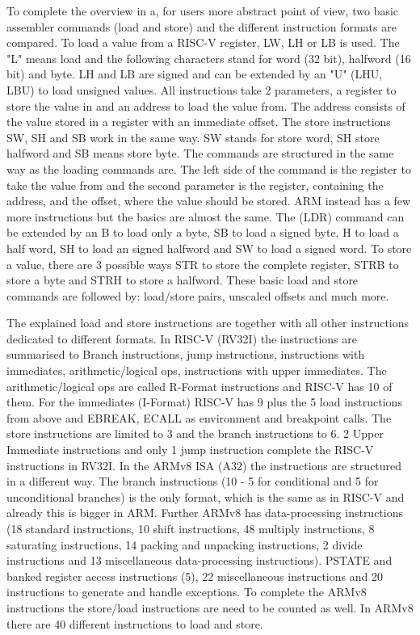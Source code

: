 \documentclass[conference]{IEEEtran}
\begin{document}
	To complete the overview in a, for users more abstract point of view, two basic assembler commands (load and store) and the different instruction formats are compared.
	To load a value from a RISC-V register, LW, LH or LB is used. The "L" means load and the following characters stand for word (32 bit), halfword (16 bit) and byte. LH and LB are signed and can be extended by an "U" (LHU, LBU) to load unsigned values. \cite{Waterman2017}
	All instructions take 2 parameters, a register to store the value in and an address to load the value from. The address consists of the value stored in a register with an immediate offset.
	The store instructions SW, SH and SB work in the same way. SW stands for store word, SH store halfword and SB means store byte. The commands are structured in the same way as the loading commands are. The left side of the command is the register to take the value from and the second parameter is the register, containing the address, and the offset, where the value should be stored.  \cite{Berkeley2019} 
	ARM instead has a few more instructions but the basics are almost the same. The (LDR) command can be extended by an B to load only a byte, SB to load a signed byte, H to load a half word, SH to load an signed halfword and SW to load a signed word. To store a value, there are 3 possible ways STR to store the complete register, STRB to store a byte and STRH to store a halfword. These basic load and store commands are followed by: load/store pairs, unscaled offsets and much more. \cite{Arm2020}

	The explained load and store instructions are together with all other instructions dedicated to different formats.
	In RISC-V (RV32I) the instructions are summarised to Branch instructions, jump instructions, instructions with immediates, arithmetic/logical ops, instructions with upper immediates.
	The arithmetic/logical ops are called R-Format instructions and RISC-V has 10 of them.  For the immediates (I-Format) RISC-V has 9 plus the 5 load instructions from above and EBREAK, ECALL as  environment and breakpoint calls. The store instructions are limited to 3 and the branch instructions to 6. 2 Upper Immediate instructions and only 1 jump instruction complete the RISC-V instructions in RV32I.\cite{Waterman2017}
	In the ARMv8 \gls{ISA} (A32) the instructions are structured in a different way.
	The branch instructions (10 -  5 for conditional and 5 for unconditional branches) is the only format, which is the same as in RISC-V and already this is bigger in ARM. Further ARMv8 has data-processing instructions (18 standard instructions, 10 shift instructions, 48 multiply instructions, 8 saturating instructions, 14 packing and unpacking instructions, 2 divide instructions and 13 miscellaneous data-processing instructions). PSTATE and banked register access instructions (5), 22 miscellaneous instructions and 20 instructions to generate and handle exceptions. To complete the ARMv8 instructions the store/load instructions are need to be counted as well. In ARMv8 there are 40 different instructions to load and store. \cite{Arm2020}
	
\end{document}
